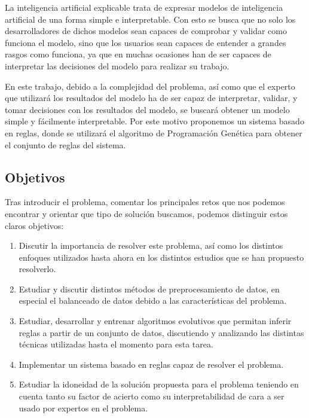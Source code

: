 La inteligencia artificial explicable trata de expresar modelos de inteligencia artificial de una forma simple e interpretable. Con esto se busca que no solo los desarrolladores de dichos modelos sean capaces de comprobar y validar como funciona el modelo, sino que los usuarios sean capaces de entender a grandes rasgos como funciona, ya que en muchas ocasiones han de ser capaces de interpretar las decisiones del modelo para realizar su trabajo.

En este trabajo, debido a la complejidad del problema, así como que el experto que utilizará los resultados del modelo ha de ser capaz de interpretar, validar, y tomar decisiones con los resultados del modelo, se buscará obtener un modelo simple y fácilmente interpretable. Por este motivo proponemos un sistema basado en reglas, donde se utilizará el algoritmo de Programación Genética para obtener el conjunto de reglas del sistema.


\subsection{Objetivos}

Tras introducir el problema, comentar los principales retos que nos podemos encontrar y orientar que tipo de solución buscamos, podemos distinguir estos claros objetivos:

\begin{enumerate}
	\item Discutir la importancia de resolver este problema, así como los distintos enfoques utilizados hasta ahora en los distintos estudios que se han propuesto resolverlo.
	\item Estudiar y discutir distintos métodos de preprocesamiento de datos, en especial el balanceado de datos debido a las características del problema.
	\item Estudiar, desarrollar y entrenar algoritmos evolutivos que permitan inferir reglas a partir de un conjunto de datos, discutiendo y analizando las distintas técnicas utilizadas hasta el momento para esta tarea.
	\item Implementar un sistema basado en reglas capaz de resolver el problema.
	\item Estudiar la idoneidad de la solución propuesta para el problema teniendo en cuenta tanto su factor de acierto como su interpretabilidad de cara a ser usado por expertos en el problema.
\end{enumerate}


\newpage
